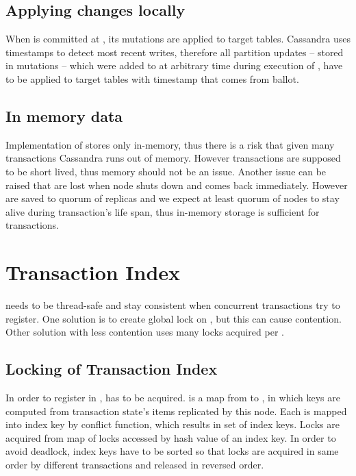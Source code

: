 \subsection{Applying changes locally}
When \transaction is committed at , its mutations are applied to target tables.
Cassandra uses timestamps to detect most recent writes, therefore all partition updates -- stored in mutations -- 
which were added to \txStorage at arbitrary time during execution of \transaction, have to be applied to target tables with timestamp that comes from \paxos ballot.



\subsection{In memory data}
Implementation of \txStorage stores \mutations only in-memory, thus there is a risk that given many transactions Cassandra runs out of memory. However transactions are supposed to be short lived, thus memory should not be an issue.
Another issue can be raised that \mutations are lost when node shuts down and comes back immediately. 
However \mutations are saved to quorum of replicas and we expect at least quorum of nodes to stay alive during transaction’s life span, thus in-memory storage is sufficient for transactions.


\section{Transaction Index}
\txIndex needs to be thread-safe and stay consistent when concurrent transactions try to register. One solution is to create global lock on \txIndex, but this can cause contention. Other solution with less contention uses many locks acquired per \txItem.

\subsection{Locking of Transaction Index}
In order to register \txState in \txIndex, \txIndex has to be acquired.
\txIndex is a map from  to , in which keys are computed from transaction state’s items replicated by this node. Each \txItem is mapped into index key by conflict function, which results in set of index keys. Locks are acquired from map of locks accessed by hash value of an index key. In order to avoid deadlock, index keys have to be sorted so that locks are acquired in same order by different transactions and released in reversed order.


